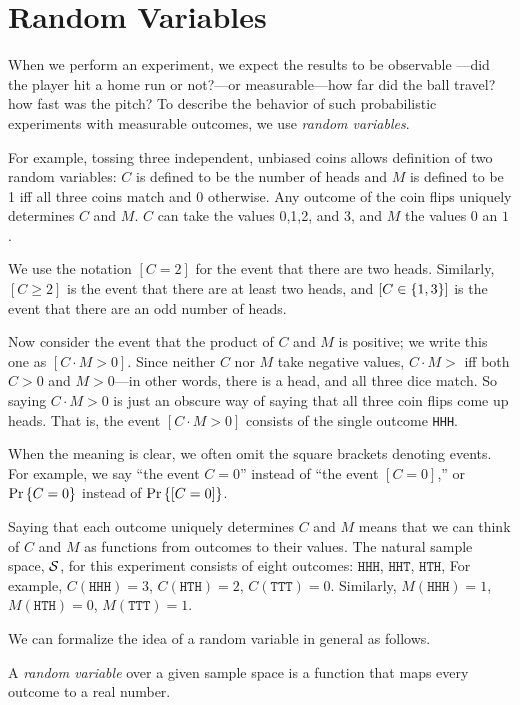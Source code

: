 \documentclass[11pt,twoside]{article}
\begin{document}

\section{Random Variables}
 
When we perform an experiment, we expect the results to be observable
---did the player hit a home run or not?---or measurable---how far did
the ball travel? how fast was the pitch?  To describe the behavior of such
probabilistic experiments with measurable outcomes, we use \emph{random
  variables}.

For example, tossing three independent, unbiased coins allows
definition of two random variables: $C$ is defined to be the number of
heads and $M$ is defined to be 1 iff all three coins match and 0
otherwise.  Any outcome of the coin flips uniquely determines $C$ and
$M$.  $C$ can take the values 0,1,2, and 3, and $M$ the values $0$ an
$1$.

We use the notation $[C = 2]$ for the event that there are two heads.
Similarly, $[C \geq 2]$ is the event that there are at least two heads,
and $[C \in \left\{1, 3\right\}]$ is the event that there are an odd number of
heads.

Now consider the event that the product of $C$ and $M$ is positive; we
write this one as $[C \cdot M >0]$.  Since neither $C$ nor $M$ take
negative values, $C\cdot M>$ iff both $C>0$ and $M>0$---in other words,
there is a head, and all three dice match.  So saying $C \cdot M >0$ is
just an obscure way of saying that all three coin flips come up heads.
That is, the event $[C \cdot M >0]$ consists of the single outcome
\texttt{HHH}.

When the meaning is clear, we often omit the square brackets denoting
events.  For example, we say ``the event $C=0$'' instead of ``the event
$[C=0]$,'' or $\mathop{\textup{Pr}}\nolimits\left\{C=0\right\}$ instead of $\mathop{\textup{Pr}}\nolimits\left\{[C=0]\right\}$.

Saying that each outcome uniquely determines $C$ and $M$ means that we can
think of $C$ and $M$ as functions from outcomes to their values.  The
natural sample space, $\mathcal{S}$, for this experiment consists of eight
outcomes: $\mathtt{HHH}$, $\mathtt{HHT}$, $\mathtt{HTH}$, \etc  For
example, $C(\mathtt{HHH}) = 3$, $C(\mathtt{HTH}) = 2$, $C(\mathtt{TTT}) =
0$.  Similarly, $M(\mathtt{HHH}) = 1$, $M(\mathtt{HTH}) = 0$,
$M(\mathtt{TTT}) = 1$.

We can formalize the idea of a random variable in general as follows.
\begin{definition}
A \emph{random variable} over a given sample space is a function that maps
every outcome to a real number.
\end{definition}
\end{document}
